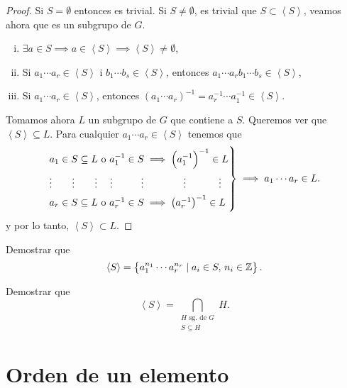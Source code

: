 \begin{proof}
    Si $S = \emptyset$ entonces es trivial.
    Si $S \neq \emptyset$, es trivial que $S \subset \left<S\right>$, veamos ahora que es un subgrupo de $G$.
    \begin{enumerate}[i)]
        \item $\exists a \in S \implies a \in \left<S\right> \implies \left<S\right> \neq \emptyset$,
        \item Si $a_1\cdots a_r \in \left<S\right>$ i $b_1\cdots b_s \in \left<S\right>$, entonces $a_1 \cdots a_r b_1 \cdots b_s \in \left<S\right>$,
        \item Si $a_1 \cdots a_r \in \left<S\right>$, entonces $\left( a_1 \cdots a_r \right)^{-1} =
            a^{-1}_r \cdots a^{-1}_1 \in \left<S\right>$.
    \end{enumerate}
    Tomamos ahora $L$ un subgrupo de $G$ que contiene a $S$. Queremos ver que $\left<S\right> \subseteq L$.
    Para cualquier $a_1 \cdots a_r \in \left<S\right>$ tenemos que
    \[
        \begin{rcases}
            a_1 \in S \subseteq L \text{ o } a^{-1}_1 \in S \implies \left( a^{-1}_1 \right)^{-1} \in L\\
            \vdots \quad \quad \vdots \quad \quad  \vdots \quad \; \vdots \;\;\; \quad \quad \vdots \quad \quad  \quad \quad \vdots \quad \quad \quad \;\vdots\\
            a_r \in S \subseteq L\text{ o } a^{-1}_r \in S \implies \left( a^{-1}_r \right)^{-1} \in L
        \end{rcases}
        \implies a_1 \cdots a_r \in L.
    \]
    y por lo tanto, $\left<S\right> \subset L$.
\end{proof}

\begin{ej}
    Demostrar que
    \[
        \left<S\right> = \left\{a^{n_1}_1 \cdots a^{n_r}_r \mid a_i \in S, \, n_i \in \mathbb{Z}\right\}.
    \]
\end{ej}

\begin{ej}
    Demostrar que
    \[
        \left<S\right> = \bigcap_{\substack{H \text{ sg. de } G \\ S \subseteq H}} H.
    \]
\end{ej}

\section{Orden de un elemento}

